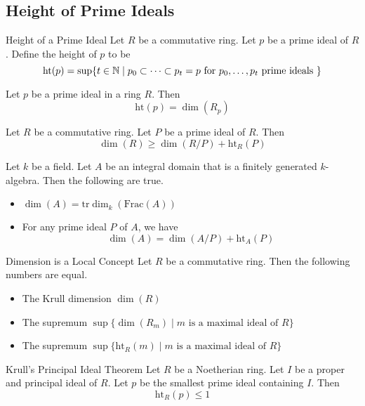 \documentclass[a4paper]{article}
\begin{document}
\subsection{Height of Prime Ideals}
\begin{defn}{Height of a Prime Ideal}{} Let $R$ be a commutative ring. Let $p$ be a prime ideal of $R$. Define the height of $p$ to be $$\text{ht}(p)=\sup\{t\in\mathbb{N}\;|\;p_0\subset\dots\subset p_t=p\text{ for }p_0,\dots,p_t\text{ prime ideals }\}$$
\end{defn}

\begin{lmm}{}{} Let $p$ be a prime ideal in a ring $R$. Then $$\text{ht}(p)=\dim(R_p)$$ 
\end{lmm}

\begin{lmm}{}{} Let $R$ be a commutative ring. Let $P$ be a prime ideal of $R$. Then $$\dim(R)\geq\dim(R/P)+\text{ht}_R(P)$$
\end{lmm}

\begin{prp}{}{} Let $k$ be a field. Let $A$ be an integral domain that is a finitely generated $k$-algebra. Then the following are true. 
\begin{itemize}
\item $\dim(A)=\text{tr}\dim_k(\text{Frac}(A))$
\item For any prime ideal $P$ of $A$, we have $$\dim(A)=\dim(A/P)+\text{ht}_A(P)$$
\end{itemize}
\end{prp}

\begin{prp}{Dimension is a Local Concept}{} Let $R$ be a commutative ring. Then the following numbers are equal. 
\begin{itemize}
\item The Krull dimension $\dim(R)$
\item The supremum $\sup\{\dim(R_m)\;|\;m\text{ is a maximal ideal of }R\}$
\item The supremum $\sup\{\text{ht}_R(m)\;|\;m\text{ is a maximal ideal of }R\}$
\end{itemize}
\end{prp}

\begin{thm}{Krull's Principal Ideal Theorem}{} Let $R$ be a Noetherian ring. Let $I$ be a proper and principal ideal of $R$. Let $p$ be the smallest prime ideal containing $I$. Then $$\text{ht}_R(p)\leq 1$$
\end{thm}
\end{document}
